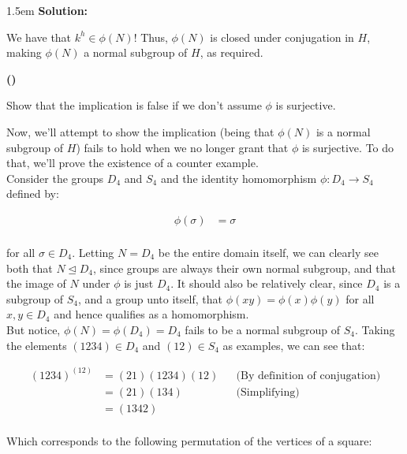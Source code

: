 \documentclass{article}
\newenvironment{solution}{
	\vspace{.5em}
	\par
	\begin{adjustwidth}{1.5em}{}
	\textbf{{Solution:}}
	\par
	\vspace{.5em}
}{
	\vspace{1em}
	\end{adjustwidth}
	\setcounter{step}{0}
	\newpage
}
\newcounter{step}
\renewcommand{\thestep}{\Roman{step}}
\newenvironment{step}{
	\refstepcounter{step}
	\vspace{1em}\par\noindent
	\ignorespaces\noindent\textbf{(\thestep)}
	\ignorespaces
}{
	\par
	\vspace{1.5em}
}
\begin{document}
\begin{solution}
	We have that $k^{h} \in \phi(N)$! Thus, $\phi(N)$ is closed under conjugation in $H$, making $\phi(N)$ a normal subgroup of $H$, as required.

	\begin{step}
		Show that the implication is false if we don't assume $\phi$ is surjective.
	\end{step}

	Now, we'll attempt to show the implication (being that $\phi(N)$ is a normal subgroup of $H$) fails to hold when we no longer grant that $\phi$ is surjective. To do that, we'll prove the existence of a counter example. \\

	Consider the groups $D_{4}$ and $S_{4}$ and the identity homomorphism $\phi \colon D_{4} \rightarrow S_{4}$ defined by:

	\begin{align*}
		\phi(\sigma) &= \sigma \\
	\end{align*}

	for all $\sigma \in D_{4}$. Letting $N = D_{4}$ be the entire domain itself, we can clearly see both that $N \unlhd D_{4}$, since groups are always their own normal subgroup, and that the image of $N$ under $\phi$ is just $D_{4}$. It should also be relatively clear, since $D_{4}$ is a subgroup of $S_{4}$, and a group unto itself, that $\phi(xy) = \phi(x)\phi(y)$ for all $x, y \in D_{4}$ and hence qualifies as a homomorphism. \\

	But notice, $\phi(N) = \phi(D_{4}) = D_{4}$ fails to be a normal subgroup of $S_{4}$. Taking the elements $(1234) \in D_{4}$ and $(12) \in S_{4}$ as examples, we can see that:

	\begin{align*}
		(1234)^{(12)} &= (21)(1234)(12) &&\text{(By definition of conjugation)} \\
		&= (21)(134) &&\text{(Simplifying)} \\
		&= (1342) \\
	\end{align*}

	Which corresponds to the following permutation of the vertices of a square:

	\vspace{1em}

	\begin{minipage}{0.40\textwidth}
		\begin{center}
\end{center}
\end{minipage}
\end{solution}
\end{document}

